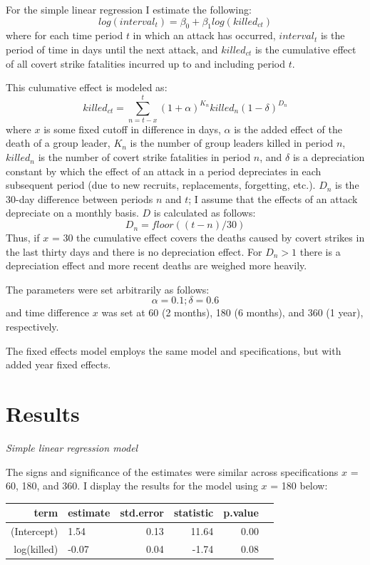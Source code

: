 \documentclass[letterpaper,12pt]{article}
\theoremstyle{definition}
\begin{document}
For the simple linear regression I estimate the following:
\[log\left(interval_t\right) = \beta_0 + \beta_1log\left(killed_{ct}\right) \]
where for each time period $t$ in which an attack has occurred, $interval_{t}$ is the period of time in days until the next attack, and $killed_{ct}$ is the cumulative effect of all covert strike fatalities incurred up to and including period $t$.

This culumative effect is modeled as:
$$killed_{ct} = \sum_{n=t-x}^{t} (1 + \alpha)^{K_n}killed_{n}(1-\delta)^{D_{n}}$$
where $x$ is some fixed cutoff in difference in days, $\alpha$ is the added effect of the death of a group leader, $K_{n}$ is the number of group leaders killed in period $n$, $killed_{n}$ is the number of covert strike fatalities in period $n$, and $\delta$ is a depreciation constant by which the effect of an attack in a period depreciates in each subsequent period (due to new recruits, replacements, forgetting, etc.). $D_{n}$ is the 30-day difference between periods $n$ and $t$; I assume that the effects of an attack depreciate on a monthly basis. $D$ is calculated as follows:
$$D_{n} = floor((t - n)/30)$$
Thus, if $x$ = 30 the cumulative effect covers the deaths caused by covert strikes in the last thirty days and there is no depreciation effect. For $D_{n} > 1$ there is a depreciation effect and more recent deaths are weighed more heavily.

The parameters were set arbitrarily as follows: 
$$\alpha = 0.1; \delta = 0.6$$
and time difference $x$ was set at 60 (2 months), 180 (6 months), and 360 (1 year), respectively.

The fixed effects model employs the same model and specifications, but with added year fixed effects.

\section{Results}
\noindent\textit{Simple linear regression model}

The signs and significance of the estimates were similar across specifications $x$ = 60, 180, and 360. I display the results for the model using $x$ = 180 below:

\begin{table}[!htb]
\centering
\begin{tabular}{rlrrrr}
  \hline
term & estimate & std.error & statistic & p.value \\ 
  \hline
(Intercept) & 1.54 & 0.13 & 11.64 & 0.00 \\ 
log(killed) & -0.07 & 0.04 & -1.74 & 0.08 \\ 
   \hline
\end{tabular}
\end{table}
\end{document}
